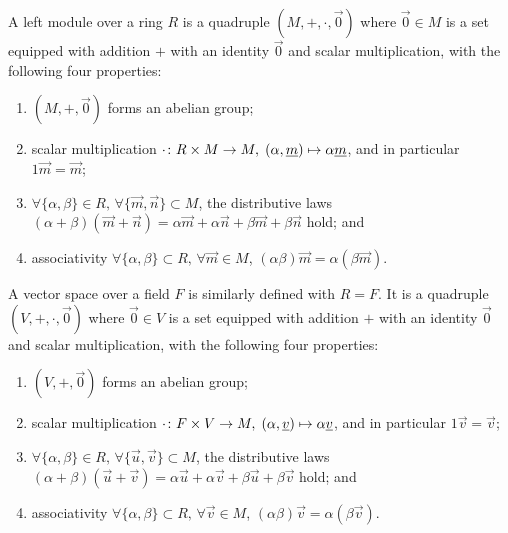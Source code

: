 \begin{definition}
    A left module over a ring \(R\) is a quadruple \((M,+,\cdot,\vec{0})\)
    where \(\vec{0} \in M\) is a set equipped with addition \(+\)
    with an identity \(\vec{0}\)
    and scalar multiplication,
    with the following four properties:
    \begin{enumerate}[label={(\roman*)}, itemsep=0mm]
        \item \((M,+,\vec{0})\) forms an abelian group;
        \item scalar multiplication
            \(\cdot\colon R \times M\to M,\;(\alpha,\underline{m})\mapsto\alpha\underline{m}\),
            and in particular \(1\vec{m} = \vec{m}\);
        \item \(\forall\{\alpha,\beta\} \in R,\, \forall\{\vec{m},\vec{n}\} \subset M\),
            the distributive laws \((\alpha+\beta)(\vec{m}+\vec{n})
            = \alpha\vec{m}+\alpha\vec{n}+\beta\vec{m}+\beta\vec{n}\) hold; and
        \item associativity
            \(\forall\{\alpha,\beta\} \subset R,\,\forall\vec{m} \in M\),
            \((\alpha\beta)\vec{m} = \alpha(\beta\vec{m})\).
    \end{enumerate}
\end{definition}
\begin{definition}
    A vector space over a field \(F\) is similarly defined with \(R = F\).
    It is a quadruple \((V,+,\cdot,\vec{0})\)
    where \(\vec{0} \in V\) is a set equipped with addition \(+\)
    with an identity \(\vec{0}\)
    and scalar multiplication,
    with the following four properties:
    \begin{enumerate}[label={(\roman*)}, itemsep=0mm]
        \item \((V,+,\vec{0})\) forms an abelian group;
        \item scalar multiplication
            \(\cdot\colon F \times V\to M,\;(\alpha,\underline{v})\mapsto\alpha\underline{v}\),
            and in particular \(1\vec{v} = \vec{v}\);
        \item \(\forall\{\alpha,\beta\} \in R,\, \forall\{\vec{u},\vec{v}\} \subset M\),
            the distributive laws \((\alpha+\beta)(\vec{u}+\vec{v})
            = \alpha\vec{u}+\alpha\vec{v}+\beta\vec{u}+\beta\vec{v}\) hold; and
        \item associativity
            \(\forall\{\alpha,\beta\} \subset R,\,\forall\vec{v} \in M\),
            \((\alpha\beta)\vec{v} = \alpha(\beta\vec{v})\).
    \end{enumerate}
\end{definition}
